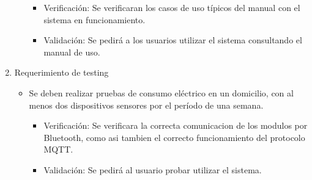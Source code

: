 \documentclass[
11pt, %
]{charter}
\begin{document}
\begin{enumerate}
\begin{itemize}
		\begin{itemize}
		\item Verificación: Se verificaran los casos de uso típicos del manual con el sistema en funcionamiento.
		\item Validación: Se pedirá a los usuarios utilizar el sistema consultando el manual de uso.
		\end{itemize}
		
		\end{itemize}
		
		
		
	
			
	\item Requerimiento de testing
		\begin{itemize}
		\item Se deben realizar pruebas de consumo eléctrico en un domicilio, con al menos dos dispositivos sensores por el período de una semana.
			\begin{itemize}
			\item Verificación: Se verificara la correcta comunicacion de los modulos por Bluetooth, como asi tambien el correcto funcionamiento del protocolo MQTT.
			\item Validación: Se pedirá al usuario probar utilizar el sistema.
			\end{itemize}
			

\end{itemize}
\end{enumerate}
\end{document}
